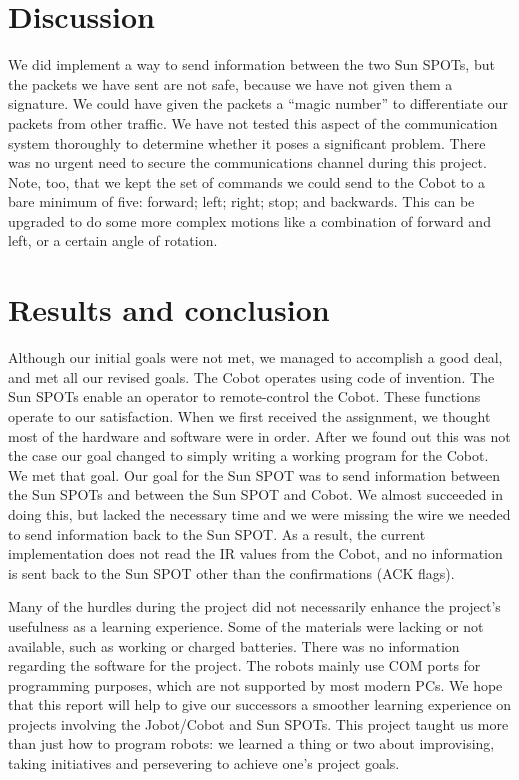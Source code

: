 \documentclass[a4paper,10pt]{article} %
\begin{document}


\section{Discussion} %

We did implement a way to send information between the two Sun SPOTs, but the
packets we have sent are not safe, because we have not given them a signature.
We could have given the packets a ``magic number'' to differentiate our packets
from other traffic. We have not tested this aspect of the communication system
thoroughly to determine whether it poses a significant problem. There was no
urgent need to secure the communications channel during this project. Note, too,
that we kept the set of commands we could send to the Cobot to a bare minimum of
five: forward; left; right; stop; and backwards. This can be upgraded to do some
more complex motions like a combination of forward and left, or a certain angle
of rotation.


\section{Results and conclusion} %

Although our initial goals were not met, we managed to accomplish a good deal,
and met all our revised goals.  The Cobot operates using code of invention. The
Sun SPOTs enable an operator to remote-control the Cobot. These functions
operate to our satisfaction. When we first received the assignment, we thought
most of the hardware and software were in order. After we found out this was not
the case our goal changed to simply writing a working program for the Cobot. We
met that goal. Our goal for the Sun SPOT was to send information between the Sun
SPOTs and between the Sun SPOT and Cobot. We almost succeeded in doing this, but
lacked the necessary time and we were missing the wire we needed to send
information back to the Sun SPOT. As a result, the current implementation does
not read the IR values from the Cobot, and no information is sent back to the
Sun SPOT other than the confirmations (ACK flags).

Many of the hurdles during the project did not necessarily enhance the project's
usefulness as a learning experience. Some of the materials were lacking or not
available, such as working or charged batteries. There was no information
regarding the software for the project.  The robots mainly use COM ports for
programming purposes, which are not supported by most modern PCs. We hope that
this report will help to give our successors a smoother learning experience on
projects involving the Jobot/Cobot and Sun SPOTs. This project taught us more
than just how to program robots: we learned a thing or two about improvising,
taking initiatives and persevering to achieve one's project goals.
\end{document}

